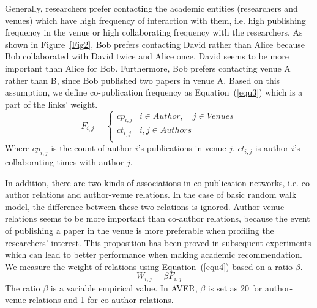\documentclass[9pt]{acm_proc_article-sp}
\begin{document}
Generally, researchers prefer contacting the academic entities (researchers and venues) which have high frequency of interaction with them, i.e. high publishing frequency in the venue or high collaborating frequency with the researchers. As shown in Figure~\ref{Fig2}, Bob prefers contacting David rather than Alice because Bob collaborated with David twice and Alice once. David seems to be more important than Alice for Bob. Furthermore, Bob prefers contacting venue A rather than B, since Bob published two papers in venue A. Based on this assumption, we define co-publication frequency as Equation~(\ref{equ3}) which is a part of the links' weight.
\begin{equation}
\label{equ3}
F_{i,j}=\left\{\begin{array}{ll}
cp_{i,j} & i\in Author,\quad j\in Venues\\
ct_{i,j} & i,j\in Authors\\
\end{array}\right.
\end{equation}
Where $cp_{i,j}$ is the count of author $i$'s publications in venue $j$. $ct_{i,j}$ is author $i$'s collaborating times with author $j$.

In addition, there are two kinds of associations in co-publication networks, i.e. co-author relations and author-venue relations. In the case of basic random walk model, the difference between these two relations is ignored. Author-venue relations seems to be more important than co-author relations, because the event of publishing a paper in the venue is more preferable when profiling the researchers' interest. This proposition has been proved in subsequent experiments which can lead to better performance when making academic recommendation. We measure the weight of relations using Equation~(\ref{equ4}) based on a ratio $\beta$.
\begin{equation}
\label{equ4}
W_{i,j}=\beta F_{i,j}
\end{equation}
The ratio $\beta$ is a variable empirical value. In AVER, $\beta$ is set as 20 for author-venue relations and 1 for co-author relations.
\end{document}
